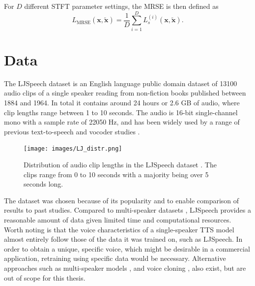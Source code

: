 \documentclass{article}
\begin{document}
For $D$ different STFT parameter settings, the MRSE is then defined as 
\begin{equation}
    L_{\text{MRSE}}(\bm{x}, \tilde{\bm{x}}) = \frac{1}{D} \sum_{i=1}^D L_{s}^{(i)}(\bm{x}, \tilde{\bm{x}}).
\end{equation}


\newpage
\section{Data}

The LJSpeech dataset \cite{ljspeech17} is an English language public domain dataset of 13100 audio clips of a single speaker reading from non-fiction books published between 1884 and 1964. In total it contains around 24 hours or 2.6 GB of audio, where clip lengths range between 1 to 10 seconds. The audio is 16-bit single-channel mono with a sample rate of 22050 Hz, and has been widely used by a range of previous text-to-speech and vocoder studies \cite{tan2021survey, kong2020diffwave, lee2021priorgrad}.

\begin{figure}[H]
    \centering
    \texttt{[image: images/LJ\_distr.png]}
    \caption{Distribution of audio clip lengths in the LJSpeech dataset \cite{ljspeech17}. The clips range from 0 to 10 seconds with a majority being over 5 seconds long.}
    \label{fig:my_label}
\end{figure}

The dataset was chosen because of its popularity and to enable comparison of results to past studies. Compared to multi-speaker datasets \cite{zen2019libritts, ardila2019common}, LJSpeech provides a reasonable amount of data given limited time and computational resources. Worth noting is that the voice characteristics of a single-speaker TTS model almost entirely follow those of the data it was trained on, such as LJSpeech.  In order to obtain a unique, specific voice, which might be desirable in a commercial application, retraining using specific data would be necessary. Alternative approaches such as multi-speaker models \cite{gibiansky2017deep, jia2018transfer}, and voice cloning \cite{arik2018neural}, also exist, but are out of scope for this thesis.

\end{document}
